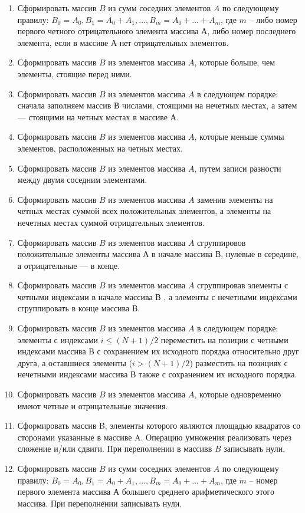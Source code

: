 \documentclass[a4paper, 12pt, oneside]{article}
\begin{document}
\begin{enumerate}
    \item Сформировать массив $B$ из сумм соседних элементов $A$ по следующему правилу: $B_0=A_0, B_1=A_0 + A_1, ..., B_m=A_0 + ... + A_m$, где $m$ – либо номер первого четного отрицательного элемента массива $А$, либо номер последнего элемента, если в массиве $А$ нет отрицательных элементов.
    \item Сформировать массив $B$ из элементов массива $A$, которые больше, чем элементы, стоящие перед ними.
    \item Сформировать массив $B$ из элементов массива $A$ в следующем порядке: сначала заполняем массив $В$ числами, стоящими на нечетных местах, а затем --- стоящими на четных местах в массиве $А$.
    \item Сформировать массив $B$ из элементов массива $A$, которые меньше суммы элементов, расположенных на четных местах.
    \item Сформировать массив $B$ из элементов массива $A$, путем записи разности между двумя соседним элементами.
    \item Сформировать массив $B$ из элементов массива $A$ заменив элементы на четных местах суммой всех положительных элементов, а элементы на нечетных местах суммой отрицательных элементов.
    \item Сформировать массив $B$ из элементов массива $A$ сгруппировов положительные элементы массива $А$ в начале массива $В$, нулевые в середине, а отрицательные — в конце.
    \item Сформировать массив $B$ из элементов массива $A$ сгруппировав элементы с четными индексами в начале массива $В$ , а элементы с нечетными индексами сгруппировать в конце массива В.
    \item Сформировать массив $B$ из элементов массива $A$ в следующем порядке: элементы с индексами $i \le (N + 1)/2$ переместить на позиции с четными индексами массива $В$ с сохранением их исходного порядка относительно друг друга, а оставшиеся элементы ($i > (N + 1)/2$) разместить на позициях с нечетными индексами массива $В$ также с сохранением их исходного порядка.
    \item Сформировать массив $B$ из элементов массива $A$, которые одновременно имеют четные и отрицательные значения.
    \item Сформировать массив B, элементы которого являются площадью квадратов со сторонами указанные в массиве A. Операцию умножения реализовать через сложение и/или сдвиги. При переполнении в массивв $B$ записывать нули.
    \item Сформировать массив $B$ из сумм соседних элементов $A$ по следующему правилу: $B_0=A_0, B_1=A_0+A_1, ..., B_m=A_0+ ... +A_m$, где $m$ – номер первого элемента массива А большего среднего арифметического этого массива. При переполнении записывать нули.

\end{enumerate}
\end{document}
